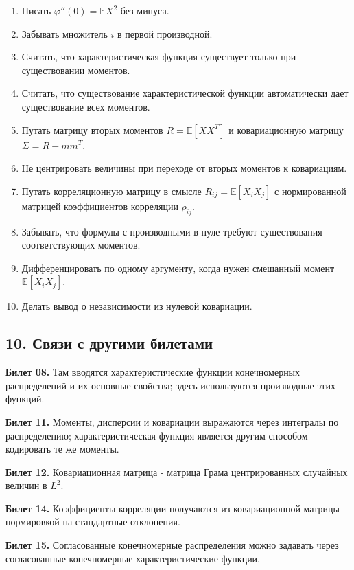 \documentclass[
  11pt,
  a4paper,
]{article}
\providecommand{\tightlist}{%
  \setlength{\itemsep}{0pt}\setlength{\parskip}{0pt}}
\begin{document}
\begin{enumerate}
\def\labelenumi{\arabic{enumi}.}
\tightlist
\item
  Писать \(\varphi''(0)=\mathbb EX^2\) без минуса.
\item
  Забывать множитель \(i\) в первой производной.
\item
  Считать, что характеристическая функция существует только при
  существовании моментов.
\item
  Считать, что существование характеристической функции автоматически
  дает существование всех моментов.
\item
  Путать матрицу вторых моментов \(R=\mathbb E[XX^T]\) и ковариационную
  матрицу \(\Sigma=R-mm^T\).
\item
  Не центрировать величины при переходе от вторых моментов к
  ковариациям.
\item
  Путать корреляционную матрицу в смысле \(R_{ij}=\mathbb E[X_iX_j]\) с
  нормированной матрицей коэффициентов корреляции \(\rho_{ij}\).
\item
  Забывать, что формулы с производными в нуле требуют существования
  соответствующих моментов.
\item
  Дифференцировать по одному аргументу, когда нужен смешанный момент
  \(\mathbb E[X_iX_j]\).
\item
  Делать вывод о независимости из нулевой ковариации.
\end{enumerate}

\subsection{10. Связи с другими
билетами}\label{ux441ux432ux44fux437ux438-ux441-ux434ux440ux443ux433ux438ux43cux438-ux431ux438ux43bux435ux442ux430ux43cux438}

\textbf{Билет 08.} Там вводятся характеристические функции конечномерных
распределений и их основные свойства; здесь используются производные
этих функций.

\textbf{Билет 11.} Моменты, дисперсии и ковариации выражаются через
интегралы по распределению; характеристическая функция является другим
способом кодировать те же моменты.

\textbf{Билет 12.} Ковариационная матрица - матрица Грама центрированных
случайных величин в \(L^2\).

\textbf{Билет 14.} Коэффициенты корреляции получаются из ковариационной
матрицы нормировкой на стандартные отклонения.

\textbf{Билет 15.} Согласованные конечномерные распределения можно
задавать через согласованные конечномерные характеристические функции.
\end{document}
